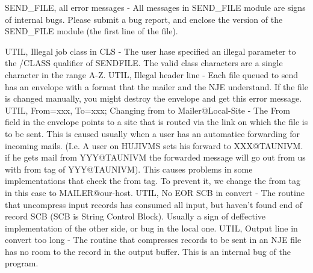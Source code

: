 \hfill\break
{\ncrBold SEND\_FILE,  all  error  messages }
- All messages in SEND\_FILE module are
signs of internal bugs. Please submit a  bug  report,  and  enclose  the
version of the SEND\_FILE module (the first line of the file).

\hfill\break
{\ncrBold UTIL,  Illegal  job  class  in  CLS }
- The user hase specified an illegal
parameter  to  the  /CLASS  qualifier  of  SENDFILE.  The  valid   class
characters are a single character in the range A-Z.
UTIL,  Illegal  header  line  - Each file queued to send has an envelope
with a format that the mailer and the NJE understand.  If  the  file  is
changed  manually,  you  might  destroy  the envelope and get this error
message.
\hfill\break
{\ncrBold UTIL, From=xxx, To=xxx; Changing from to Mailer@Local-Site }
-  The  From
field  in  the  envelope points to a site that is routed via the link on
which the file is to be sent. This is caused usually when a user has  an
automatice  forwarding  for incoming mails. (I.e. A user on HUJIVMS sets
his forward to  XXX@TAUNIVM.  if  he  gets  mail  from  YYY@TAUNIVM  the
forwarded  message  will  go  out from us with from tag of YYY@TAUNIVM).
This causes problems in some implementations that check the from tag. To
prevent it, we change the from tag in this case to MAILER@our-host.
UTIL,  No EOR SCB in convert - The routine that uncompress input records
has consumed all input, but haven't found end  of  record  SCB  (SCB  is
String  Control  Block).  Usually a sign of deffective implementation of
the other side, or bug in the local one.
\hfill\break
{\ncrBold UTIL, Output line in convert too long }
-  The  routine  that  compresses
records  to  be  sent  in  an  NJE file has no room to the record in the
output buffer. This is an internal bug of the program.

